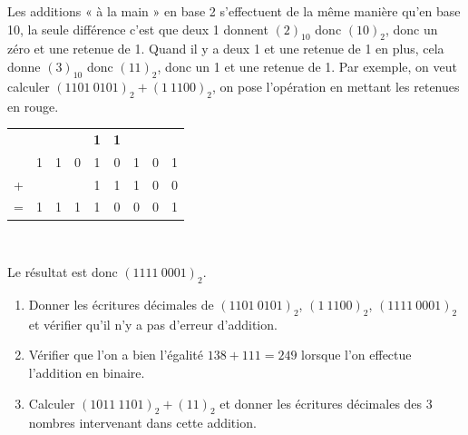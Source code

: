 \begin{exercice}
    Les additions «  à la main » en base 2 s'effectuent de la même manière qu'en base 10, la seule différence c'est que deux 1 donnent $(2)_{10}$ donc $(10)_2$, donc un zéro et une retenue de 1.
    Quand il y a deux 1 et une retenue de 1 en plus, cela donne $(3)_{10}$ donc $(11)_2$, donc un 1 et une retenue de 1. Par exemple,
    on veut calculer $(1101\ 0101)_2+(1\ 1100)_2$, on pose l'opération en mettant les retenues en rouge.
    \begin{center}
        \tabdefault
        \begin{tabular}{ccccccccc}
              &   &   &   & {\color{red}\textbf{\footnotesize 1}} & {\color{red}\textbf{\footnotesize 1}} &   &   &   \\
              & 1 & 1 & 0 & 1                                     & 0                                     & 1 & 0 & 1 \\
            + &   &   &   & 1                                     & 1                                     & 1 & 0 & 0 \\
            \hline
            = & 1 & 1 & 1 & 1                                     & 0                                     & 0 & 0 & 1 \\
        \end{tabular} \\[2em]
    \end{center}
    Le résultat est donc $(1111\ 0001)_2$.
    \begin{enumerate}
        \item 	Donner les écritures décimales de  $(1101\ 0101)_2$, $(1\ 1100)_2$, $(1111\ 0001)_2$ et vérifier qu'il n'y a pas d'erreur d'addition.
        \item 	Vérifier que l'on a bien l'égalité $138+111=249$ lorsque l'on effectue l'addition en binaire.
        \item 	Calculer $(1011\ 1101)_2+(11)_2$ et donner les écritures décimales des 3 nombres intervenant dans cette addition.\\
    \end{enumerate}
\end{exercice}

